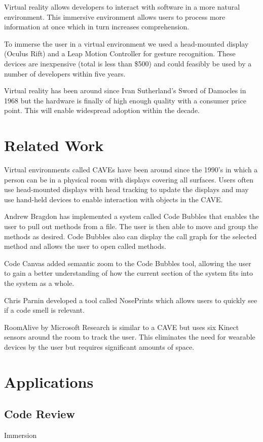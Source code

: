 \documentclass{acm_proc_article-sp}
\begin{document}
Virtual reality allows developers to interact with software in a more natural environment. This immersive environment allows users to process more information at once which in turn increases comprehension.

To immerse the user in a virtual environment we used a head-mounted display (Oculus Rift) and a Leap Motion Controller for gesture recognition. These devices are inexpensive (total is less than \$500) and could feasibly be used by a number of developers within five years.

Virtual reality has been around since Ivan Sutherland's Sword of Damocles in 1968 but the hardware is finally of high enough quality with a consumer price point. This will enable widespread adoption within the decade.

\section{Related Work}
Virtual environments called CAVEs have been around since the 1990's in which a person can be in a physical room with displays covering all surfaces.  Users often use head-mounted displays with head tracking to update the displays and may use hand-held devices to enable interaction with objects in the CAVE.

Andrew Bragdon has implemented a system called Code Bubbles that enables the user to pull out methods from a file. The user is then able to move and group the methods as desired.  Code Bubbles also can display the call graph for the selected method and allows the user to open called methods.

Code Canvas added semantic zoom to the Code Bubbles tool, allowing the user to gain a better understanding of how the current section of the system fits into the system as a whole.

Chris Parnin developed a tool called NosePrints which allows users to quickly see if a code smell is relevant.

RoomAlive by Microsoft Research is similar to a CAVE but uses six Kinect sensors around the room to track the user.  This eliminates the need for wearable devices by the user but requires significant amounts of space.

\section{Applications}
\subsection{Code Review}
Immersion
\end{document}
